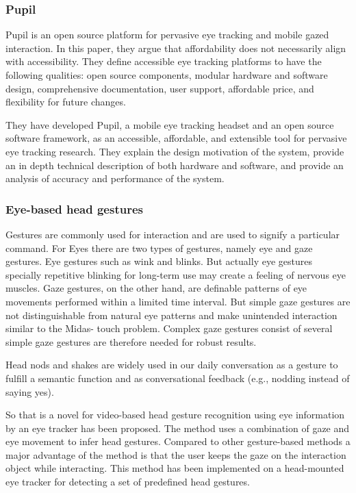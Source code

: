 \subsubsection{Pupil}
Pupil is an open source platform for pervasive eye tracking and mobile gazed interaction. In this paper, they argue that affordability does not necessarily align with accessibility. They define accessible eye tracking platforms to have the following qualities: open source components, modular hardware and software design, comprehensive documentation, user support, affordable price, and flexibility for future changes. \bigskip

They have developed Pupil, a mobile eye tracking headset and an open source software framework, as an accessible, affordable, and extensible tool for pervasive eye tracking research. They explain the design motivation of the system, provide an in depth technical description of both hardware and software, and provide an analysis of accuracy and performance of the system.
\bigskip


\subsubsection{Eye-based head gestures}
	Gestures are commonly used for interaction and are used to signify a particular command. For Eyes there are two types of gestures, namely eye and gaze gestures. Eye gestures such as wink and blinks. But actually eye gestures specially repetitive blinking for long-term use may create a feeling of nervous eye muscles.\cite{drewes2010eye} Gaze gestures, on the other hand, are definable patterns of eye movements performed within a limited time interval.\cite{istance2010designing} But simple gaze gestures are not distinguishable from natural eye patterns and make unintended interaction similar to the Midas-
touch problem. Complex gaze gestures consist of several simple gaze gestures are therefore needed for robust results.\bigskip

	Head nods and shakes are widely used in our daily conversation as a gesture to fulfill a semantic function and as conversational feedback (e.g., nodding instead of saying yes). \cite{darwin1998expression}
	\bigskip
	
	So that is a novel for video-based head gesture recognition using eye information by an eye tracker has been proposed. The method uses a combination of gaze and eye movement to infer head gestures. Compared to other gesture-based methods a major advantage of the method is that the user keeps the gaze on the interaction object while interacting. This method has been implemented on a head-mounted eye tracker for detecting a set of predefined head gestures.\cite{mardanbegi2012eye}

